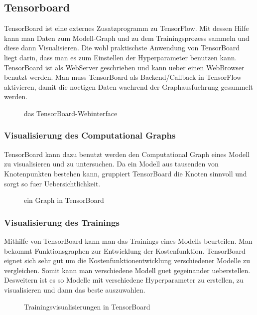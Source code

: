 \subsection{Tensorboard}
TensorBoard ist eine externes Zusatzprogramm zu TensorFlow. Mit dessen Hilfe
kann man Daten zum Modell-Graph und zu dem Trainingsprozess sammeln
und diese dann Visualisieren.
Die wohl praktischste Anwendung von TensorBoard liegt darin, dass man es zum
Einstellen der Hyperparameter benutzen kann.
\para{}
TensorBoard ist als WebServer geschrieben und kann ueber einen WebBrowser
benutzt werden.
Man muss TensorBoard als Backend/Callback in TensorFlow aktivieren, damit die
noetigen Daten waehrend der Graphausfuehrung gesammelt werden.

\begin{figure}[h!]
  \centering

  \caption{das TensorBoard-Webinterface}
\end{figure}

\subsubsection{Visualisierung des Computational Graphs}
TensorBoard kann dazu benutzt werden den Computational Graph eines Modell zu
visualisieren und zu untersuchen.
Da ein Modell aus tausenden von Knotenpunkten bestehen kann, gruppiert
TensorBoard die Knoten sinnvoll und sorgt so fuer Uebersichtlichkeit.


\begin{figure}[h!]
  \centering

  \caption{ein Graph in TensorBoard}
\end{figure}

\subsubsection{Visualisierung des Trainings}
Mithilfe von TensorBoard kann man das Trainings eines Modells beurteilen. Man
bekommt Funktionsgraphen zur Entwicklung der Kostenfunktion.
TensorBoard eignet sich sehr gut um die Kostenfunktionentwicklung verschiedener
Modelle zu vergleichen. Somit kann man verschiedene Modell guet gegeinander
ueberstellen. Desweitern ist es so Modelle mit verschiedene Hyperparameter zu
erstellen, zu visualisieren und dann das beste auszuwahlen.

\begin{figure}[h!]
  \centering

  \caption{Trainingsvisualisierungen in TensorBoard}
\end{figure}


